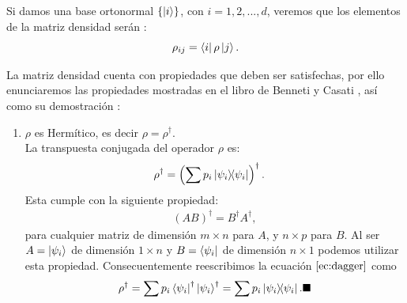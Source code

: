 \documentclass[letterpaper,12pt]{thesisECFM}
\theoremstyle{plain}
\theoremstyle{definition}
\theoremstyle{definition}
\theoremstyle{remark}
\newcommand{\1}{\mathbb{1}}
\begin{document}
Si damos una base ortonormal $\{\ket{i}\}$, con $i=1,2,...,d$, veremos que los elementos de la
matriz densidad serán \cite{princip_quantum}:
\begin{equation}
    \label{eq:rho_ij}
    \rho_{ij} = \bra{i} \rho \ket{j}.
\end{equation}
   
La matriz densidad cuenta con propiedades que deben ser satisfechas, por ello
enunciaremos las propiedades mostradas en el libro de  Benneti y Casati
\cite{princip_quantum}, así como su demostración :
\begin{enumerate}
\item $\rho$ es Hermítico, es decir $\rho = \rho^{\dagger}.$\\ 
La transpuesta conjugada del operador $\rho$ es:
\begin{align}
    \label{ec:dagger}
    \rho^{\dagger}  & = \left( \sum p_i \ketbra{\psi_i}  \right)^{\dagger}.
\end{align}
Esta cumple con la siguiente propiedad:
\begin{align}
    (AB)^{\dagger} = B^{\dagger} A^{\dagger},
\end{align}
para cualquier matriz de dimensión $m\times n $ para $A$,  y $n \times p$ para
$B$. Al ser $A = \ket{\psi_i}$ de dimensión $1\times n$ y $B = \bra{\psi_i}$ de
dimensión $n \times 1$ podemos utilizar esta propiedad. Consecuentemente
reescribimos la ecuación $\ref{ec:dagger}$ como
\begin{align}
    \rho^{\dagger} = \sum p_i  \bra{\psi_i}^{\dagger} \ket{\psi_i}^{\dagger} = \sum p_i \ketbra{\psi_i}.  \blacksquare
\end{align}


\end{enumerate}
\end{document}
